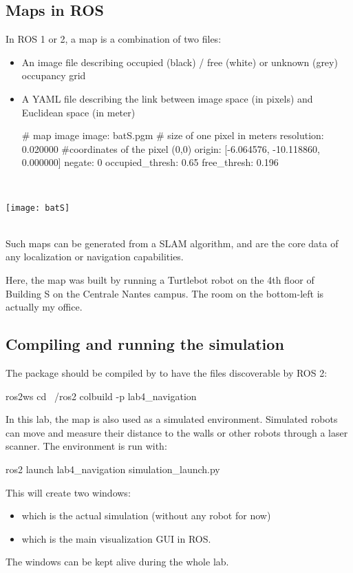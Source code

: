 \documentclass{ecnreport}
\begin{document}
\subsection{Maps in ROS}

In ROS 1 or 2, a map is a combination of two files:\\

\begin{minipage}{.6\linewidth}
 \begin{itemize}
  \item An image file describing occupied (black) / free (white) or unknown (grey) occupancy grid
  \item A YAML file describing the link between image space (in pixels) and Euclidean space (in meter)
  \begin{pythoncodelarge}
# map image
image: batS.pgm  
# size of one pixel in meters
resolution: 0.020000
#coordinates of the pixel (0,0)
origin: [-6.064576, -10.118860, 0.000000]
negate: 0
occupied_thresh: 0.65 
free_thresh: 0.196
  \end{pythoncodelarge}
 \end{itemize} 
\end{minipage}
\begin{minipage}{.05\linewidth}
 ~
\end{minipage}
\begin{minipage}{.33\linewidth}
 \texttt{[image: batS]}
\end{minipage}~\\

Such maps can be generated from a SLAM algorithm, and are the core data of any localization or navigation capabilities.

Here, the map was built by running a Turtlebot robot on the 4th floor of Building S on the Centrale Nantes campus. The room on the bottom-left is actually my office.


\subsection{Compiling and running the simulation}

The package should be compiled by  to have the files discoverable by ROS 2:
\begin{bashcodelarge}
 ros2ws
 cd ~/ros2
 colbuild -p lab4_navigation
\end{bashcodelarge}

In this lab, the map is also used as a simulated environment. Simulated robots can move and measure their distance to the walls or other robots through a laser scanner. The environment is run with:
\begin{bashcodelarge}
 ros2 launch lab4_navigation simulation_launch.py 
\end{bashcodelarge}This will create two windows:
\begin{itemize}
 \item {} which is the actual simulation (without any robot for now)
 \item {} which is the main visualization GUI in ROS.
\end{itemize}
The windows can be kept alive during the whole lab.
\end{document}
